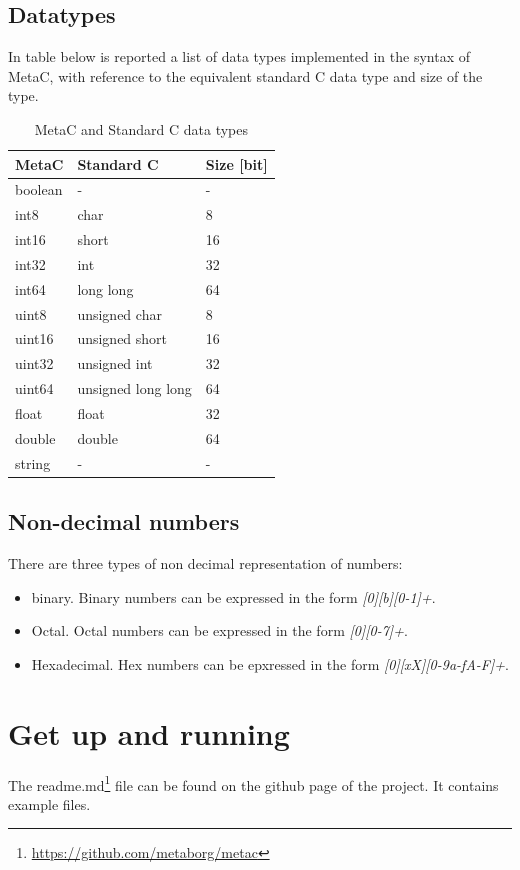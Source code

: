\documentclass[a4paper,10pt,titlepage]{report}
\begin{document}
\section{Datatypes}
In table below is reported a list of data types implemented in the syntax of MetaC, with reference to the equivalent standard C data type and size of the type.
\begin{table}[ht!]
\centering
\begin{tabular}{|l|l|l|}
\hline
MetaC & Standard C & Size [bit] \\ \hline
boolean & - & -\\ 
int8 & char & 8 \\ 
int16 & short & 16 \\ 
int32 & int & 32 \\ 
int64 & long long & 64 \\ 
uint8 & unsigned char & 8 \\ 
uint16 & unsigned short & 16 \\ 
uint32 & unsigned int & 32 \\ 
uint64 & unsigned long long & 64 \\ 
float & float & 32 \\ 
double & double & 64 \\ 
string & - & - \\
\hline
\end{tabular}
\caption{MetaC and Standard C data types}
\end{table}

\section{Non-decimal numbers}
There are three types of non decimal representation of numbers:
\begin{itemize}
\item binary. Binary numbers can be expressed in the form \emph{[0][b][0-1]+}.
\item Octal. Octal numbers can be expressed in the form \emph{[0][0-7]+}.
\item Hexadecimal. Hex numbers can be epxressed in the form \emph{[0][xX][0-9a-fA-F]+}.
\end{itemize}

\chapter{Get up and running}

The readme.md\footnote{\url{https://github.com/metaborg/metac}} file can be found on the github page of the project. It contains example files.
\end{document}
